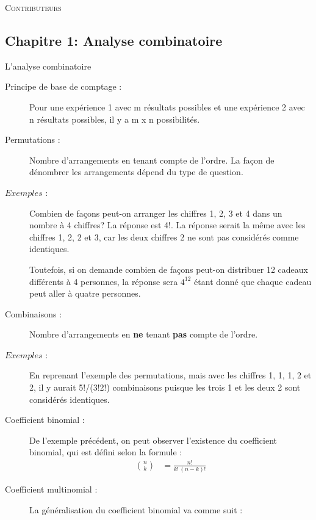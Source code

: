 \documentclass[10pt, french]{article}
\begin{document}
\begin{center}
	\textsc{\Large Contributeurs}\\[0.5cm] 
\end{center}


\newpage

\raggedcolumns
\begin{multicols*}{3}

\section{Chapitre 1: Analyse combinatoire}
\begin{probch1}{L'analyse combinatoire}
\begin{description}
  \item[Principe de base de comptage :] Pour une expérience 1 avec m résultats possibles et une expérience 2 avec n résultats possibles, il y a m x n possibilités.
  \item[Permutations :] Nombre d'arrangements en tenant compte de l'ordre. La façon de dénombrer les arrangements dépend du type de question.
	  \item[$Exemples$ :] Combien de façons peut-on arranger les chiffres 1, 2, 3 et 4 dans un nombre à 4 chiffres? La réponse est {4!}. La réponse serait la même avec les chiffres 1, 2, 2 et 3, car les deux chiffres 2 ne sont pas considérés comme identiques. 
	  \item[] Toutefois, si on demande combien de façons peut-on distribuer 12 cadeaux différents à 4 personnes, la réponse sera $ 4^{12} $ étant donné que chaque cadeau peut aller à quatre personnes.
	\item[Combinaisons :] Nombre d'arrangements en \textbf{ne} tenant \textbf{pas} compte de l'ordre.
	 \item[$Exemples$ :] En reprenant l'exemple des permutations, mais avec les chiffres 1, 1, 1, 2 et 2, il y aurait 5!/(3!2!) combinaisons puisque les trois 1 et les deux 2 sont considérés identiques.
	 \item[Coefficient binomial :] De l'exemple précédent, on peut observer l'existence du coefficient binomial, qui est défini selon la formule :
	 \begin{align*}
	 \binom{n}{k}
	 &= \frac{n!}{k! \,(n-k)!}
	 \end{align*}
  \item[Coefficient multinomial :] La généralisation du coefficient binomial va comme suit :
  \begin{align*}

\end{align*}
\end{description}
\end{probch1}
\end{multicols*}
\end{document}
